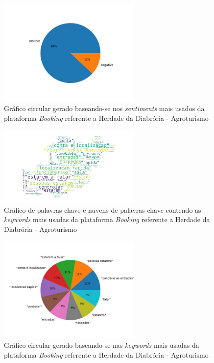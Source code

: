 \begin{figure}[!htb]
\centering
\includegraphics[width=7cm]{figuras/Booking/hotel21_sentiments.jpeg}
\caption{Gráfico circular gerado baseando-se nos \textit{sentiments} mais usados da plataforma \textit{Booking} referente a Herdade da Diabrória - Agroturismo}
\label{fig:exemplofig}
\end{figure}

\begin{figure}[!htb]
\centering
\includegraphics[width=7cm]{figuras/Booking/hotel21_keywordcloud.jpeg}
\caption{Gráfico de palavras-chave e nuvens de palavras-chave contendo as \textit{keywords} mais usadas da plataforma \textit{Booking} referente a Herdade da Diabrória - Agroturismo}
\label{fig:exemplofig}
\end{figure}

\begin{figure}[!htb]
\centering
\includegraphics[width=7cm]{figuras/Booking/hotel21_keywords.jpeg}
\caption{Gráfico circular gerado baseando-se nas \textit{keywords} mais usadas da plataforma \textit{Booking} referente a Herdade da Diabrória - Agroturismo}
\label{fig:exemplofig}
\end{figure}

